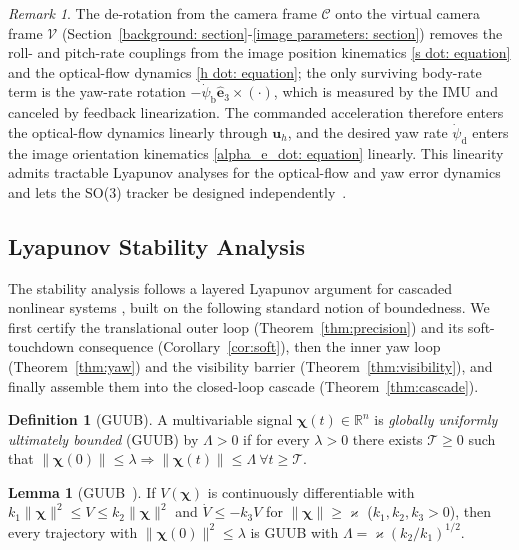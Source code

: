 \documentclass{IEEEtaes}
\theoremstyle{definition}
\newtheorem{lemma}{Lemma}
\newtheorem{definition}{Definition}
\theoremstyle{remark}
\newtheorem{remark}{Remark}
\begin{document}
\begin{remark}\label{rem:linearity} The de-rotation from the camera frame $\mathcal{C}$ onto the virtual camera frame $\mathcal{V}$ (Section~\ref{background: section}-\ref{image parameters: section}) removes the roll- and pitch-rate couplings from the image position kinematics \eqref{s dot: equation} and the optical-flow dynamics \eqref{h dot: equation}; the only surviving body-rate term is the yaw-rate rotation $-\dot{\psi}_\text{b}\hat{\boldsymbol{e}}_3\times(\cdot)$, which is measured by the IMU and canceled by feedback linearization. The commanded acceleration therefore enters the optical-flow dynamics linearly through $\boldsymbol{u}_h$, and the desired yaw rate $\dot{\psi}_\text{d}$ enters the image orientation kinematics \eqref{alpha_e_dot: equation} linearly. This linearity admits tractable Lyapunov analyses for the optical-flow and yaw error dynamics and lets the SO(3) tracker be designed independently~\cite{fink2017, xie2016_2}.\end{remark}

\subsection{Lyapunov Stability Analysis} \label{stability: section}
The stability analysis follows a layered Lyapunov argument for cascaded nonlinear systems \cite{khalil2002}, built on the following standard notion of boundedness. We first certify the translational outer loop (Theorem~\ref{thm:precision}) and its soft-touchdown consequence (Corollary~\ref{cor:soft}), then the inner yaw loop (Theorem~\ref{thm:yaw}) and the visibility barrier (Theorem~\ref{thm:visibility}), and finally assemble them into the closed-loop cascade (Theorem~\ref{thm:cascade}).

\begin{definition}[GUUB]\label{def:guub} A multivariable signal $\boldsymbol{\chi}(t)\in\mathbb{R}^n$ is \emph{globally uniformly ultimately bounded} (GUUB) by $\Lambda>0$ if for every $\lambda>0$ there exists $\mathcal{T}\ge 0$ such that $\|\boldsymbol{\chi}(0)\|\le\lambda\Rightarrow\|\boldsymbol{\chi}(t)\|\le\Lambda\ \forall t\ge\mathcal{T}$.\end{definition}

\begin{lemma}[GUUB~\cite{khalil2002}]\label{lem:guub} If $V(\boldsymbol{\chi})$ is continuously differentiable with $k_1\|\boldsymbol{\chi}\|^2\le V\le k_2\|\boldsymbol{\chi}\|^2$ and $\dot{V}\le -k_3 V$ for $\|\boldsymbol{\chi}\|\ge\varkappa$ ($k_1,k_2,k_3>0$), then every trajectory with $\|\boldsymbol{\chi}(0)\|^2\le\lambda$ is GUUB with $\Lambda = \varkappa(k_2/k_1)^{1/2}$.\end{lemma}
\end{document}
